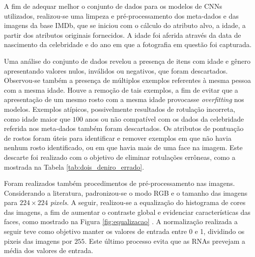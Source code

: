 A fim de adequar melhor o conjunto de dados para os modelos de CNNs utilizados, realizou-se uma limpeza e pré-processamento dos meta-dados e das imagens da base IMDb, que se iniciou com o cálculo do atributo alvo, a idade, a partir dos atributos originais fornecidos. A idade foi aferida através da data de nascimento da celebridade e do ano em que a fotografia em questão foi capturada.

Uma análise do conjunto de dados revelou a presença de itens com idade e gênero apresentando valores nulos, inválidos ou negativos, que foram descartados. Observou-se também a presença de múltiplos exemplos referentes à mesma pessoa com a mesma idade. Houve a remoção de tais exemplos, a fim de evitar que a apresentação de um mesmo rosto com a mesma idade provocasse \emph{overfitting} nos modelos. Exemplos atípicos, possivelmente resultados de rotulação incorreta, como idade maior que $100$ anos ou não compatível com os dados da celebridade referida nos meta-dados também foram descartados. Os atributos de pontuação de rostos foram úteis para identificar e remover exemplos em que não havia nenhum rosto identificado, ou em que havia mais de uma face na imagem. Este descarte foi realizado com o objetivo de eliminar rotulações errôneas, como a mostrada na Tabela \ref{tab:dois_deniro_errado}.

Foram realizados também procedimentos de pré-processamento nas imagens. Considerando a literatura, padronizou-se o modo RGB e o tamanho das imagens para $224 \times 224$ \emph{pixels}. A seguir, realizou-se a equalização do histograma de cores das imagens, a fim de aumentar o contraste global e evidenciar características das faces, como mostrado na Figura \ref{fig:equalizacao} \cite{}. A normalização realizada a seguir teve como objetivo manter os valores de entrada entre 0 e 1, dividindo os pixeis das imagens por $255$. Este último processo evita que as RNAs prevejam a média dos valores de entrada.

